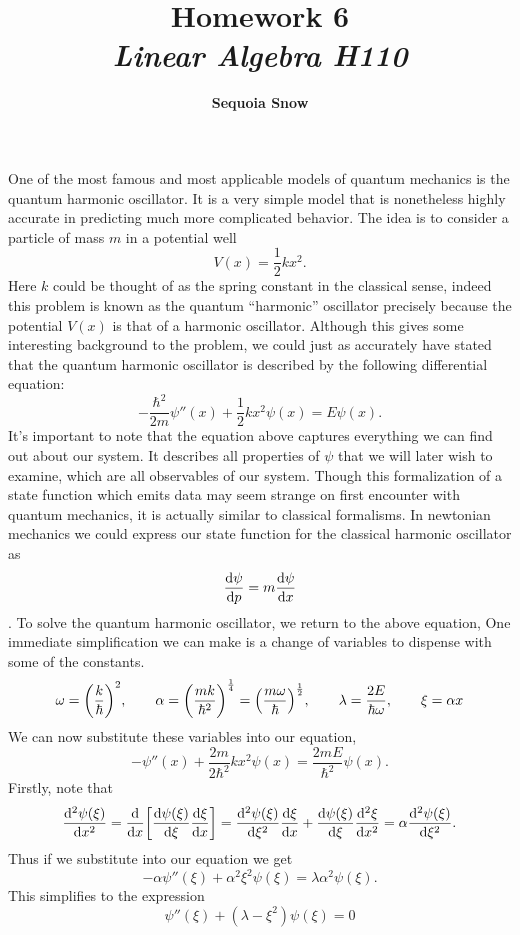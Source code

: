 \documentclass[10pt]{article}
\title{
\vspace{2in}
\textmd{\textbf{Homework 6}}\\
\vspace{0.11in}\large{\textit{Linear Algebra H110}}
\vspace{3in}
}
\author{\textbf{Sequoia Snow}}
\date{}
\begin{document}
One of the most famous and most applicable models of quantum mechanics is the quantum harmonic oscillator. It is a very simple model that is nonetheless highly accurate in predicting much more complicated behavior. The idea is to consider a particle of mass $m$ in a potential well 
\[
  V(x) = \frac{1}{2} kx^2.
\]
Here $k$ could be thought of as the spring constant in the classical sense, indeed this problem is known as the quantum ``harmonic'' oscillator precisely because the potential $V(x)$ is that of a harmonic oscillator. Although this gives some interesting background to the problem, we could just as accurately have stated that the quantum harmonic oscillator is described by the following differential equation:
\[
  -\frac{\hbar^2}{2m} \psi''(x) + \frac{1}{2}kx^2 \psi(x) = E\psi(x).
\]
It's important to note that the equation above captures everything we can find out about our system. It describes all properties of $\psi$ that we will later wish to examine, which are all observables of our system. Though this formalization of a state function which emits data may seem strange on first encounter with quantum mechanics, it is actually similar to classical formalisms. In newtonian mechanics we could express our state function for the classical harmonic oscillator as 
\[
  \dv{\psi}{p} = m \dv{\psi}{x}
\].
To solve the quantum harmonic oscillator, we return to the above equation, One immediate simplification we can make is a change of variables to dispense with some of the constants.
\[
  \omega = \qty(\frac{k}{\hbar})^2, \qquad \alpha = \qty(\frac{mk}{\hbar^2})^\frac{1}{4} = \qty(\frac{m\omega}{\hbar})^\frac{1}{2}, \qquad 
  \lambda = \frac{2E}{\hbar \omega}, \qquad 
   \xi = \alpha x
\] 
We can now substitute these variables into our equation,
\[
-\psi''(x) + \frac{2m}{2\hbar^2}kx^2 \psi(x) = \frac{2mE}{\hbar^2}\psi(x).
\]
Firstly, note that 
\[
  \dv[2]{\psi(\xi)}{x} 
  = \dv{x} \qty[  \dv{\psi(\xi)}{\xi} \dv{\xi}{x}  ]
  =  \dv[2]{\psi(\xi)}{\xi} \dv{\xi}{x}  +  \dv{\psi(\xi)}{\xi} \dv[2]{\xi}{x} 
  =  \alpha \dv[2]{\psi(\xi)}{\xi}.
\]
Thus if we substitute into our equation we get
\[
  -\alpha \psi''(\xi) + \alpha^2 \xi^2 \psi(\xi) = \lambda \alpha^2 \psi(\xi).
\]
This simplifies to the expression 
\[
  \psi''(\xi ) + (\lambda - \xi^2) \psi(\xi) = 0
\]
\end{document}
